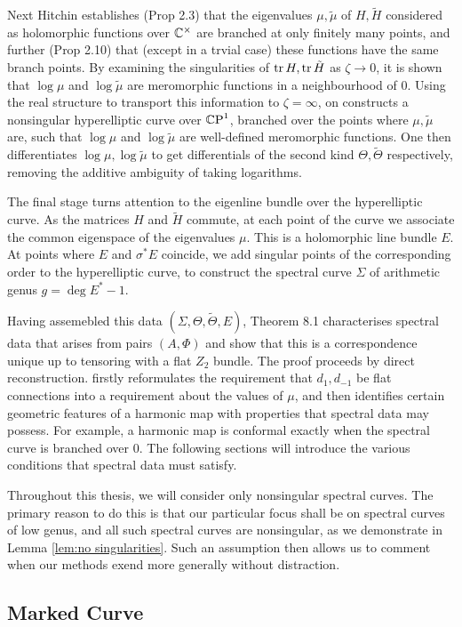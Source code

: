 Next Hitchin establishes (Prop 2.3) that the eigenvalues $μ,\tilde{μ}$ of $H,\tilde{H}$ considered as holomorphic functions over $\mathbb{C}^\times$ are branched at only finitely many points, and further (Prop 2.10) that (except in a trvial case) these functions have the same branch points. By examining the singularities of $\operatorname*{tr} H, \operatorname*{tr} \tilde{H}$ as $ζ\to 0$, it is shown that $\log μ$ and $\log \tilde{μ}$ are meromorphic functions in a neighbourhood of $0$. Using the real structure to transport this information to $ζ=\infty$, on constructs a nonsingular hyperelliptic curve over $\mathbb{C}\text{P}^1$, branched over the points where $μ,\tilde{μ}$ are, such that $\log μ$ and $\log \tilde{μ}$ are well-defined meromorphic functions. One then differentiates $\log μ, \log \tilde{μ}$ to get differentials of the second kind $Θ,\tilde{Θ}$ respectively, removing the additive ambiguity of taking logarithms.

The final stage turns attention to the eigenline bundle over the hyperelliptic curve. As the matrices $H$ and $\tilde{H}$ commute, at each point of the curve we associate the common eigenspace of the eigenvalues $μ$. This is a holomorphic line bundle $E$. At points where $E$ and $σ^*E$ coincide, we add singular points of the corresponding order to the hyperelliptic curve, to construct the spectral curve $Σ$ of arithmetic genus $g = \deg E^* - 1$.

Having assemebled this data $(Σ,Θ,\tilde{Θ},E)$, Theorem 8.1 characterises spectral data that arises from pairs $(A,Φ)$ and show that this is a correspondence unique up to tensoring with a flat $Z_2$ bundle. The proof proceeds by direct reconstruction. \cite[Theorem~8.20]{Hitchin1990} firstly reformulates the requirement that $d_1, d_{-1}$ be flat connections into a requirement about the values of $μ$, and then identifies certain geometric features of a harmonic map with properties that spectral data may possess. For example, a harmonic map is conformal exactly when the spectral curve is branched over $0$. The following sections will introduce the various conditions that spectral data must satisfy.

Throughout this thesis, we will consider only nonsingular spectral curves. The primary reason to do this is that our particular focus shall be on spectral curves of low genus, and all such spectral curves are nonsingular, as we demonstrate in Lemma \ref{lem:no singularities}. Such an assumption then allows us to comment when our methods exend more generally without distraction.

\subsection{Marked Curve}

